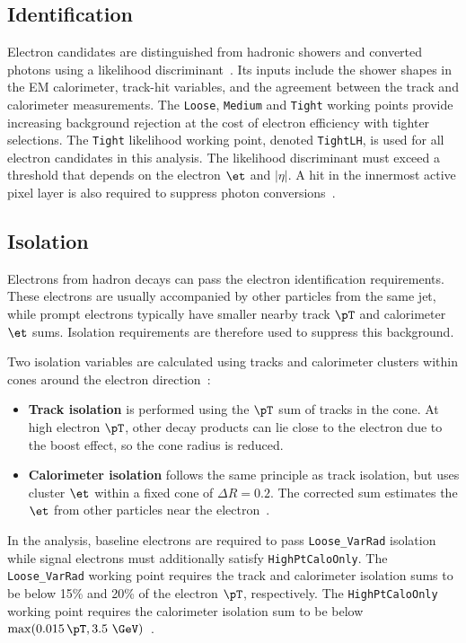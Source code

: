 \subsection{Identification}

Electron candidates are distinguished from hadronic showers and converted photons using a likelihood discriminant~\cite{ATLAS2019ElectronReco}.
Its inputs include the shower shapes in the EM calorimeter, track-hit variables, and the agreement between the track and calorimeter measurements.
The \texttt{Loose}, \texttt{Medium} and \texttt{Tight} working points provide increasing background rejection at the cost of electron efficiency with tighter selections.
The \texttt{Tight} likelihood working point, denoted \texttt{TightLH}, is used for all electron candidates in this analysis.
The likelihood discriminant must exceed a threshold that depends on the electron $\et$ and $|\eta|$.
A hit in the innermost active pixel layer is also required to suppress photon conversions~\cite{ATLAS2019ElectronReco}.

\subsection{Isolation}

Electrons from hadron decays can pass the electron identification requirements.
These electrons are usually accompanied by other particles from the same jet, while prompt electrons typically have smaller nearby track $\pT$ and calorimeter $\et$ sums.
Isolation requirements are therefore used to suppress this background.

Two isolation variables are calculated using tracks and calorimeter clusters within cones around the electron direction~\cite{ATLAS2019ElectronPerformance}:
\begin{itemize}
    \item \textbf{Track isolation} is performed using the $\pT$ sum of tracks in the cone. At high electron $\pT$, other decay products can lie close to the electron due to the boost effect, so the cone radius is reduced.
    \item \textbf{Calorimeter isolation} follows the same principle as track isolation, but uses cluster $\et$ within a fixed cone of $\Delta R=0.2$. The corrected sum estimates the $\et$ from other particles near the electron~\cite{ATLAS2019ElectronPerformance}.
\end{itemize}
In the analysis, baseline electrons are required to pass \texttt{Loose\_VarRad} isolation while signal electrons must additionally satisfy \texttt{HighPtCaloOnly}.
The \texttt{Loose\_VarRad} working point requires the track and calorimeter isolation sums to be below 15\% and 20\% of the electron $\pT$, respectively.
The \texttt{HighPtCaloOnly} working point requires the calorimeter isolation sum to be below $\max(0.015\,\pT,3.5~\GeV)$~\cite{ATLAS2019ElectronPerformance}.

